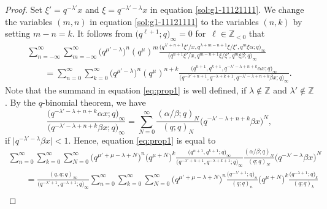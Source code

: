 \documentclass[pdftex]{sigma}
\numberwithin{equation}{section}
\theoremstyle{definition}
\begin{document}
\begin{proof}
Set $\xi ' = q ^{-\lambda ' }x $ and $\xi = q^{ -\lambda ' -\lambda } x$ in equation \eqref{sol:g1-11121111}.
We change the variables $(m,n)$ in equation \eqref{sol:g1-11121111} to the variables $(n,k)$ by setting $m-n = k$.
It follows from $\bigl(q^{\ell +1};q\bigr)_{\infty} = 0$ for~${\ell \in \mathbb{Z}_{<0}}$ that
\begin{gather}
 \sum_{n = -\infty}^{\infty} \sum_{m = -\infty}^{\infty} \bigl(q^{\mu' - \lambda}\bigr)^n (q^{\mu})^m \frac{\bigl(q^{\lambda' + n + 1}\xi'/x, q^{\lambda + m - n + 1}\xi/\xi', q^m \xi \alpha; q\bigr)_{\infty}}{\bigl(q^{n + 1}\xi'/x, q^{m - n + 1}\xi/\xi', q^m\xi \beta; q\bigr)_{\infty}} \nonumber \\
\qquad = \sum_{n = 0}^{\infty} \sum_{k = 0}^{\infty} \bigl(q^{\mu' - \lambda}\bigr)^n (q^{\mu})^{n+ k} \frac{\bigl(q^{n + 1}, q^{k + 1} , q^{ -\lambda ' -\lambda +n+k} \alpha x ; q\bigr)_{\infty}}{\bigl(q^{-\lambda' + n + 1} , q^{- \lambda + k + 1}, q^{ -\lambda ' -\lambda +n+k} \beta x ; q\bigr)_{\infty}}.  \label{eq:prop1}
\end{gather}
Note that the summand in equation \eqref{eq:prop1} is well defined, if $\lambda \not \in {\mathbb Z}$ and $\lambda ' \not \in {\mathbb Z}$.
By the $q$-binomial theorem, we have
\begin{equation*}
\frac{\bigl(q^{ -\lambda ' -\lambda +n+k} \alpha x; q\bigr)_{\infty}}{\bigl(q^{ -\lambda ' -\lambda +n+k} \beta x; q\bigr)_{\infty}}
= \sum_{N=0}^{\infty} \frac{(\alpha /\beta ; q)_N}{(q; q)_N} \bigl(q^{ -\lambda ' -\lambda +n+k} \beta x\bigr)^N ,
\end{equation*}
if $\big|q^{ -\lambda ' -\lambda } \beta x \big| <1$.
Hence, equation \eqref{eq:prop1} is equal to
\begin{gather}
\sum_{n = 0}^{\infty} \sum_{k = 0}^{\infty} \sum_{N=0}^{\infty} \bigl(q^{\mu' +\mu - \lambda +N }\bigr)^n \bigl(q^{\mu +N} \bigr)^ {k} \frac{\bigl(q^{n + 1}, q^{k + 1} ; q\bigr)_{\infty}}{\bigl(q^{-\lambda' + n + 1} , q^{- \lambda + k + 1} ; q\bigr)_{\infty}} \frac{(\alpha /\beta ; q)_N}{(q; q)_N} \bigl(q^{ -\lambda ' -\lambda } \beta x\bigr)^N \nonumber\\
\qquad= \frac{(q, q; q)_{\infty}}{\bigl(q^{-\lambda' + 1} , q^{- \lambda + 1} ; q\bigr)_{\infty}} \sum_{n = 0}^{\infty} \sum_{k = 0}^{\infty} \sum_{N=0}^{\infty} \bigl(q^{\mu' +\mu - \lambda +N }\bigr)^n \frac{\bigl(q^{-\lambda' + 1}; q\bigr)_n}{(q; q)_n} \bigl(q^{\mu +N} \bigr)^ {k} \frac{\bigl(q^{-\lambda + 1} ; q\bigr)_k}{(q; q)_k} \nonumber \\

\end{gather}
\end{proof}
\end{document}
